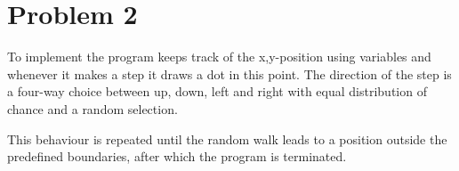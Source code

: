 \section*{Problem 2}

To implement  the program keeps track of the x,y-position
using variables and whenever it makes a step it draws a dot in this point. The
direction of the step is a four-way choice between up, down, left and right
with equal distribution of chance and a random selection.

This behaviour is repeated until the random walk leads to a position outside
the predefined boundaries, after which the program is terminated.